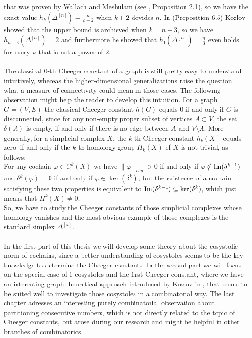 that was proven by Wallach and Meshulam (see \cite{4}, Proposition 2.1), so we have the exact value \(h_k(\Delta^{[n]})=\frac{n}{k+2}\) when \(k+2\) devides \(n\). In \cite{1} (Proposition 6.5) Kozlov showed that the upper bound is archieved when \(k=n-3\), so we have \(h_{n-3}(\Delta^{[n]})=2\) and furthermore he showed that \(h_1(\Delta^{[n]})=\frac{n}{3}\) even holds for every \(n\) that is not a power of \(2\).\\
\\
The classical \(0\)-th Cheeger constant of a graph is still pretty easy to understand intuitively, whereas the higher-dimensional generalizations raise the question what a measure of connectivity could mean in those cases. The following observation might help the reader to develop this intuition. For a graph \(G=(V,E)\) the classical Cheeger constant \(h(G)\) equals \(0\) if and only if \(G\) is disconnected, since for any non-empty proper subset of vertices \(A\subset V\), the set \(\delta(A)\) is empty, if and only if there is no edge between \(A\) and \(V\setminus A\). More generally, for a simplicial complex \(X\), the \(k\)-th Cheeger constant \(h_k(X)\) equals zero, if and only if the \(k\)-th homology group \(H_k(X)\) of \(X\) is not trivial, as follows:\\
For any cochain \(\varphi\in C^k(X)\) we have \(\|\varphi\|_{csy}>0\) if and only if \(\varphi\notin\mathrm{Im}(\delta^{k-1})\) and \(\delta^k(\varphi)=0\) if and only if \(\varphi\in\ker(\delta^k)\), but the existence of a cochain satisfying these two properties is equivalent to \(\mathrm{Im}(\delta^{k-1})\subsetneq\ker(\delta^k)\), which just means that \(H^k(X)\neq 0\).\\
So, we have to study the Cheeger constants of those simplicial complexes whose homology vanishes and the most obvious example of those complexes is the standard simplex \(\Delta^{[n]}\).\\
\\
In the first part of this thesis we will develop some theory about the cosystolic norm of cochains, since a better understanding of cosystoles seems to be the key knowledge to determine the Cheeger constants. In the second part we will focus on the special case of \(1\)-cosystoles and the first Cheeger constant, where we have an interesting graph theoretical approach introduced by Kozlov in \cite{1}, that seems to be suited well to investigate those cosystoles in a combinatorial way. The last chapter adresses an interesting purely combinatorial observation about partitioning consecutive numbers, which is not directly related to the topic of Cheeger constants, but arose during our research and might be helpful in other branches of combinatorics.

